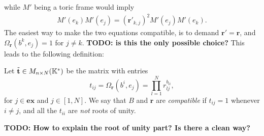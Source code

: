 \documentclass{article}
\begin{document}
while $M'$ being a toric frame would imply
\begin{align*}
	M'(e_k)M'(e_j) = (\mathbf{r}'_{k,j})^2 M'(e_j)M'(e_k).
\end{align*}
The easiest way to make the two equations compatible,
is to demand $\mathbf{r}' = \mathbf{r}$,
and $\Omega_{\mathbf{r}}(b^k, e_j) = 1$ for $j \neq k$.
\textbf{TODO: is this the only possible choice?}
This leads to the following definition:
\begin{definition}
	Let $\tilde{\mathbf{t}} \in M_{n \times N}(\mathbb{K}^*)$ be the matrix with entries
	\begin{equation*}
		t_{ij} = \Omega_{\mathbf{r}}(b^i, e_j) = \prod_{l = 1}^N r_{lj}^{b_{li}},
	\end{equation*}
	for $j \in \mathbf{ex}$ and $j \in [1, N]$.
	We say that $B$ and $\mathbf{r}$ are \emph{compatible} if
	$t_{ij} = 1$ whenever $i \neq j$,
	and all the $t_{ii}$ are \emph{not} roots of unity.
\end{definition}
\textbf{TODO: How to explain the root of unity part? Is there a clean way?}



\end{document}
